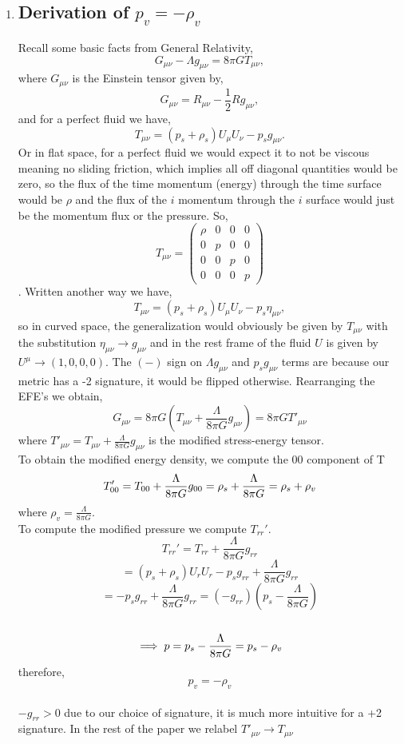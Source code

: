 \documentclass[12pt]{amsart}
\begin{document}
\begin{enumerate}
\item 
\subsection{Derivation of $p_v = - \rho_v$}
Recall some basic facts from General Relativity,
$$G_{\mu \nu} - \Lambda g_{\mu \nu} = 8 \pi G T_{\mu \nu},$$ 
where $G_{\mu \nu}$ is the Einstein tensor given by,
$$G_{\mu \nu} = R_{\mu \nu} - \frac{1}{2} R g_{\mu \nu},$$ 
and for a perfect fluid we have,
$$T_{\mu \nu} = ( p_s + \rho_s) U_{\mu} U_{\nu} - p_s g_{\mu \nu}.$$
Or in flat space, for a perfect fluid we would expect it to not be viscous meaning no sliding friction, which implies all off diagonal quantities would be zero, so the flux of the time momentum (energy) through the time surface would be $\rho$ and the flux of the $i$ momentum through the $i$ surface would just be the momentum flux or the pressure. So,
$$T_{\mu \nu} = \begin{pmatrix} \rho & 0 & 0 & 0 \\ 0 & p & 0 & 0 \\ 0 & 0 & p & 0 \\ 0 & 0 & 0 & p \end{pmatrix}$$.
Written another way we have,
$$T_{\mu \nu} = ( p_s + \rho_s) U_{\mu} U_{\nu} - p_s \eta_{\mu \nu},$$
so in curved space, the generalization would obviously be given by $T_{\mu \nu}$ with the substitution $\eta_{\mu \nu} \rightarrow g_{\mu \nu}$
and in the rest frame of the fluid $U$ is given by $U^{\mu} \rightarrow (1,0,0,0).$ The
 $(-)$ sign on $\Lambda g_{\mu \nu}$ and $p_s g_{\mu \nu}$ terms are because our metric has a -2 signature, it would be flipped otherwise. Rearranging the EFE's we obtain,\\
$$ G_{\mu \nu} = 8 \pi G ( T_{\mu \nu} + \frac{\Lambda}{8 \pi G} g_{\mu \nu}) = 8 \pi G T'_{\mu \nu}$$
where $T'_{\mu \nu} = T_{\mu \nu} + \frac{\Lambda}{8 \pi G} g_{\mu \nu}$ is the modified stress-energy tensor.\\
To obtain the modified energy density, we compute the 00 component of T
$$T_{00}' = T_{00} + \frac{\Lambda}{8 \pi G} g_{00} = \rho_s + \frac{\Lambda}{8 \pi G} = \rho_s + \rho_v\\$$
where $\rho_v = \frac{\Lambda}{8 \pi G}.$\\
To compute the modified pressure we compute $T_{rr}'$.
$$T_{rr}' = T_{rr} + \frac{\Lambda}{8 \pi G} g_{rr}$$
$$= ( p_s + \rho_s) U_r U_r - p_s g_{rr} + \frac{\Lambda}{8 \pi G} g_{rr}$$
$$= - p_s g_{rr} + \frac{\Lambda}{8 \pi G} g_{rr} = (- g_{rr})(p_s - \frac{\Lambda}{8 \pi G})$$\\
$$\implies p= p_s - \frac{\Lambda}{8 \pi G} = p_s - \rho_v\\$$
therefore,\\
$$p_v = - \rho_v$$\\
$-g_{rr}>0$ due to our choice of signature, it is much more intuitive for a +2 signature.
In the rest of the paper we relabel $T'_{\mu \nu} \rightarrow T_{\mu \nu}$




\end{enumerate}
\end{document}
